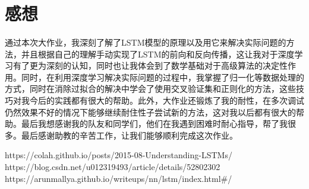 \documentclass[UTF8]{ctexart}
\begin{document}
\section{感想}
\paragraph*{}
通过本次大作业，我深刻了解了LSTM模型的原理以及用它来解决实际问题的方法，并且根据自己的理解手动实现了LSTM的前向和反向传播，这让我对于深度学习有了更为深刻的认知，同时也让我体会到了数学基础对于高级算法的决定性作用。同时，在利用深度学习解决实际问题的过程中，我掌握了归一化等数据处理的方式，同时在消除过拟合的解决中学会了使用交叉验证集和正则化的方法，这些技巧对我今后的实践都有很大的帮助。此外，大作业还锻炼了我的耐性，在多次调试仍然效果不好的情况下能够继续耐住性子尝试新的方法，这对我以后都有很大的帮助。最后我想感谢我的队友和同学们，他们在我遇到困难时耐心指导，帮了我很多。最后感谢助教的辛苦工作，让我们能够顺利完成这次作业。

\begin{thebibliography}{3}
    https://colah.github.io/posts/2015-08-Understanding-LSTMs/
    https://blog.csdn.net/u012319493/article/details/52802302
    https://arunmallya.github.io/writeups/nn/lstm/index.html\#/
\end{thebibliography}
\end{document}
